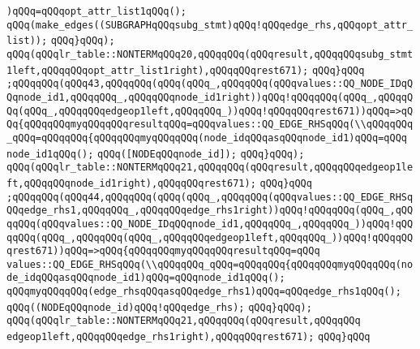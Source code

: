 \verb|)qQQq=qQQqopt_attr_list1qQQq();|\newline
\verb|qQQq(make_edges((SUBGRAPHqQQqsubg_stmt)qQQq!qQQqedge_rhs,qQQqopt_attr_list));|\newline
\verb|qQQq}qQQq);|\newline
\verb|qQQq(qQQqlr_table::NONTERMqQQq20,qQQqqQQq(qQQqresult,qQQqqQQqsubg_stmt1left,qQQqqQQqopt_attr_list1right),qQQqqQQqrest671);|\newline
\verb|qQQq}qQQq|\newline
\verb|;qQQqqQQq(qQQq43,qQQqqQQq(qQQq(qQQq_,qQQqqQQq(qQQqvalues::QQ_NODE_IDqQQqnode_id1,qQQqqQQq_,qQQqqQQqnode_id1right))qQQq!qQQqqQQq(qQQq_,qQQqqQQq(qQQq_,qQQqqQQqedgeop1left,qQQqqQQq_))qQQq!qQQqqQQqrest671))qQQq=>qQQq{qQQqqQQqmyqQQqqQQqresultqQQq=qQQqvalues::QQ_EDGE_RHSqQQq(\\qQQqqQQq_qQQq=qQQqqQQq{qQQqqQQqmyqQQqqQQq(node_idqQQqasqQQqnode_id1)qQQq=qQQq|\newline
\verb|node_id1qQQq();|\newline
\verb|qQQq([NODEqQQqnode_id]);|\newline
\verb|qQQq}qQQq);|\newline
\verb|qQQq(qQQqlr_table::NONTERMqQQq21,qQQqqQQq(qQQqresult,qQQqqQQqedgeop1left,qQQqqQQqnode_id1right),qQQqqQQqrest671);|\newline
\verb|qQQq}qQQq|\newline
\verb|;qQQqqQQq(qQQq44,qQQqqQQq(qQQq(qQQq_,qQQqqQQq(qQQqvalues::QQ_EDGE_RHSqQQqedge_rhs1,qQQqqQQq_,qQQqqQQqedge_rhs1right))qQQq!qQQqqQQq(qQQq_,qQQqqQQq(qQQqvalues::QQ_NODE_IDqQQqnode_id1,qQQqqQQq_,qQQqqQQq_))qQQq!qQQqqQQq(qQQq_,qQQqqQQq(qQQq_,qQQqqQQqedgeop1left,qQQqqQQq_))qQQq!qQQqqQQqrest671))qQQq=>qQQq{qQQqqQQqmyqQQqqQQqresultqQQq=qQQq|\newline
\verb|values::QQ_EDGE_RHSqQQq(\\qQQqqQQq_qQQq=qQQqqQQq{qQQqqQQqmyqQQqqQQq(node_idqQQqasqQQqnode_id1)qQQq=qQQqnode_id1qQQq();|\newline
\verb|qQQqmyqQQqqQQq(edge_rhsqQQqasqQQqedge_rhs1)qQQq=qQQqedge_rhs1qQQq();|\newline
\verb|qQQq((NODEqQQqnode_id)qQQq!qQQqedge_rhs);|\newline
\verb|qQQq}qQQq);|\newline
\verb|qQQq(qQQqlr_table::NONTERMqQQq21,qQQqqQQq(qQQqresult,qQQqqQQq|\newline
\verb|edgeop1left,qQQqqQQqedge_rhs1right),qQQqqQQqrest671);|\newline
\verb|qQQq}qQQq|\newline
